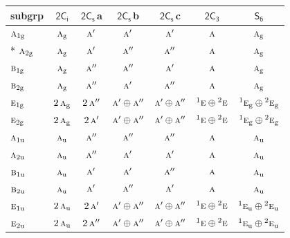 \documentclass[10pt,a4paper]{article}
\numberwithin{equation}{section}
\newcommand{\grp}[1]{\mathsf{#1}}
\newcommand{\irr}[1]{\text{\normalfont\scshape #1}}
\newcommand{\conjpair}[1]{{}^{#1}}
\newcommand{\ptag}[1]{\mathrm{#1}}
\newcommand{\clsletter}[1]{\,{\scriptsize\color{black!55}#1}}
\begin{document}
{\small\begin{longtable}{@{}lcccccc@{}}\toprule
subgrp & \href{2S2.pdf}{$\grp{2C_{i}}$} & \href{2C1v.pdf}{$\grp{2C_{s}}$}\clsletter{a} & \href{2C1v.pdf}{$\grp{2C_{s}}$}\clsletter{b} & \href{2C1v.pdf}{$\grp{2C_{s}}$}\clsletter{c} & \href{2C3.pdf}{$\grp{2C_{3}}$} & \href{S6.pdf}{$\grp{S_{6}}$}\\\midrule\endhead
\bottomrule\endfoot\endlastfoot
$\irr{a}_{1\ptag{g}}$ & $\irr{a}_{\ptag{g}}$ & $\irr{a}'$ & $\irr{a}'$ & $\irr{a}'$ & $\irr{a}$ & $\irr{a}_{\ptag{g}}$\\*
$\irr{a}_{2\ptag{g}}$ & $\irr{a}_{\ptag{g}}$ & $\irr{a}'$ & $\irr{a}''$ & $\irr{a}''$ & $\irr{a}$ & $\irr{a}_{\ptag{g}}$\\
$\irr{b}_{1\ptag{g}}$ & $\irr{a}_{\ptag{g}}$ & $\irr{a}''$ & $\irr{a}''$ & $\irr{a}'$ & $\irr{a}$ & $\irr{a}_{\ptag{g}}$\\
$\irr{b}_{2\ptag{g}}$ & $\irr{a}_{\ptag{g}}$ & $\irr{a}''$ & $\irr{a}'$ & $\irr{a}''$ & $\irr{a}$ & $\irr{a}_{\ptag{g}}$\\
$\irr{e}_{1\ptag{g}}$ & $2\,\irr{a}_{\ptag{g}}$ & $2\,\irr{a}''$ & $\irr{a}'\oplus \irr{a}''$ & $\irr{a}'\oplus \irr{a}''$ & $\conjpair{1}\irr{e}\oplus \conjpair{2}\irr{e}$ & $\conjpair{1}\irr{e}_{\ptag{g}}\oplus \conjpair{2}\irr{e}_{\ptag{g}}$\\
$\irr{e}_{2\ptag{g}}$ & $2\,\irr{a}_{\ptag{g}}$ & $2\,\irr{a}'$ & $\irr{a}'\oplus \irr{a}''$ & $\irr{a}'\oplus \irr{a}''$ & $\conjpair{1}\irr{e}\oplus \conjpair{2}\irr{e}$ & $\conjpair{1}\irr{e}_{\ptag{g}}\oplus \conjpair{2}\irr{e}_{\ptag{g}}$\\
$\irr{a}_{1\ptag{u}}$ & $\irr{a}_{\ptag{u}}$ & $\irr{a}''$ & $\irr{a}''$ & $\irr{a}''$ & $\irr{a}$ & $\irr{a}_{\ptag{u}}$\\
$\irr{a}_{2\ptag{u}}$ & $\irr{a}_{\ptag{u}}$ & $\irr{a}''$ & $\irr{a}'$ & $\irr{a}'$ & $\irr{a}$ & $\irr{a}_{\ptag{u}}$\\
$\irr{b}_{1\ptag{u}}$ & $\irr{a}_{\ptag{u}}$ & $\irr{a}'$ & $\irr{a}'$ & $\irr{a}''$ & $\irr{a}$ & $\irr{a}_{\ptag{u}}$\\
$\irr{b}_{2\ptag{u}}$ & $\irr{a}_{\ptag{u}}$ & $\irr{a}'$ & $\irr{a}''$ & $\irr{a}'$ & $\irr{a}$ & $\irr{a}_{\ptag{u}}$\\
$\irr{e}_{1\ptag{u}}$ & $2\,\irr{a}_{\ptag{u}}$ & $2\,\irr{a}'$ & $\irr{a}'\oplus \irr{a}''$ & $\irr{a}'\oplus \irr{a}''$ & $\conjpair{1}\irr{e}\oplus \conjpair{2}\irr{e}$ & $\conjpair{1}\irr{e}_{\ptag{u}}\oplus \conjpair{2}\irr{e}_{\ptag{u}}$\\
$\irr{e}_{2\ptag{u}}$ & $2\,\irr{a}_{\ptag{u}}$ & $2\,\irr{a}''$ & $\irr{a}'\oplus \irr{a}''$ & $\irr{a}'\oplus \irr{a}''$ & $\conjpair{1}\irr{e}\oplus \conjpair{2}\irr{e}$ & $\conjpair{1}\irr{e}_{\ptag{u}}\oplus \conjpair{2}\irr{e}_{\ptag{u}}$\\

\end{longtable}}
\end{document}
